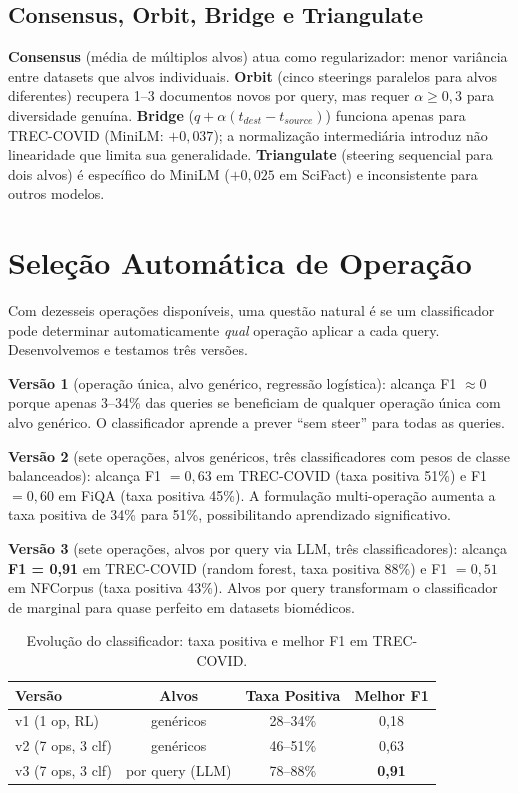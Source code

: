 \documentclass{article}
\begin{document}
\subsection{Consensus, Orbit, Bridge e Triangulate}

\textbf{Consensus} (média de múltiplos alvos) atua como regularizador: menor variância entre datasets que alvos individuais. \textbf{Orbit} (cinco steerings paralelos para alvos diferentes) recupera 1--3 documentos novos por query, mas requer $\alpha \geq 0{,}3$ para diversidade genuína. \textbf{Bridge} ($q + \alpha(t_{dest} - t_{source})$) funciona apenas para TREC-COVID (MiniLM: $+0{,}037$); a normalização intermediária introduz não linearidade que limita sua generalidade. \textbf{Triangulate} (steering sequencial para dois alvos) é específico do MiniLM ($+0{,}025$ em SciFact) e inconsistente para outros modelos.

\section{Seleção Automática de Operação}
\label{sec:classifier}

Com dezesseis operações disponíveis, uma questão natural é se um classificador pode determinar automaticamente \emph{qual} operação aplicar a cada query. Desenvolvemos e testamos três versões.

\textbf{Versão 1} (operação única, alvo genérico, regressão logística): alcança F1 $\approx 0$ porque apenas 3--34\% das queries se beneficiam de qualquer operação única com alvo genérico. O classificador aprende a prever ``sem steer'' para todas as queries.

\textbf{Versão 2} (sete operações, alvos genéricos, três classificadores com pesos de classe balanceados): alcança F1 $= 0{,}63$ em TREC-COVID (taxa positiva 51\%) e F1 $= 0{,}60$ em FiQA (taxa positiva 45\%). A formulação multi-operação aumenta a taxa positiva de 34\% para 51\%, possibilitando aprendizado significativo.

\textbf{Versão 3} (sete operações, alvos por query via LLM, três classificadores): alcança \textbf{F1 = 0,91} em TREC-COVID (random forest, taxa positiva 88\%) e F1 $= 0{,}51$ em NFCorpus (taxa positiva 43\%). Alvos por query transformam o classificador de marginal para quase perfeito em datasets biomédicos.

\begin{table}[h]
\centering
\caption{Evolução do classificador: taxa positiva e melhor F1 em TREC-COVID.}
\begin{tabular}{lccc}
\toprule
Versão & Alvos & Taxa Positiva & Melhor F1 \\
\midrule
v1 (1 op, RL) & genéricos & 28--34\% & 0,18 \\
v2 (7 ops, 3 clf) & genéricos & 46--51\% & 0,63 \\
v3 (7 ops, 3 clf) & por query (LLM) & 78--88\% & \textbf{0,91} \\
\bottomrule
\end{tabular}
\end{table}
\end{document}
